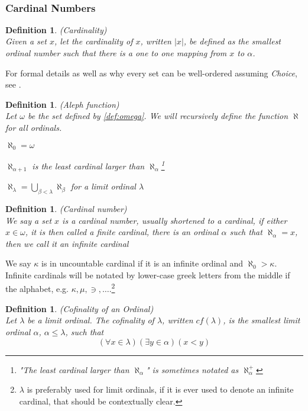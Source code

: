 \documentclass[12pt,a4paper]{article}
\newtheorem{definition}[theorem]{Definition}
\newcommand{\bce}{\begin{compactenum}}
\newcommand{\ece}{\end{compactenum}}
\begin{document}
\

\subsubsection{Cardinal Numbers}

\begin{definition}{(Cardinality)}\\
Given a set $x$, let the cardinality of $x$, written $|x|$, be defined as the smallest ordinal number such that there is a one to one mapping from $x$ to $\alpha$.
\end{definition}
For formal details as well as why every set can be well-ordered assuming \emph{Choice}, see \cite{JechBook}.

\begin{definition}{(Aleph function)}\label{def:aleph}\\
Let $\omega$ be the set defined by \ref{def:omega}.
We will recursively define the function $\aleph$ for all ordinals.
\bce[(i)]
\item $\aleph_0 = \omega$
\item $\aleph_{\alpha+1}$ is the least cardinal larger than $\aleph_\alpha$\footnote{"The least cardinal larger than $\aleph_\alpha$" is sometimes notated as $\aleph_\alpha^{+}$}
\item $\aleph_\lambda = \bigcup_{\beta < \lambda}\aleph_\beta$ for a limit ordinal $\lambda$
\ece
\end{definition}

\begin{definition}{(Cardinal number)}\label{def:cardinal}\\
We say a set $x$ is a \emph{cardinal number}, usually shortened to \emph{a cardinal}, if either $x \in \omega$, it is then called a \emph{finite cardinal}, 
there is an ordinal $\alpha$ such that $\aleph_\alpha = x$, then we call it \emph{an infinite cardinal}
\end{definition}
We say $\kappa$ is in uncountable cardinal if it is an infinite ordinal and $\aleph_0 > \kappa$.
Infinite cardinals will be notated by lower-case greek letters from the middle if the alphabet, e.g. $\kappa, \mu, \ni, \ldots$.\footnote{$\lambda$ is preferably used for limit ordinals, if it is ever used to denote an infinite cardinal, that should be contextually clear.}

\begin{definition}{(Cofinality of an Ordinal)}\label{def:cofinality}\\ %
Let $\lambda$ be a limit ordinal. The \emph{cofinality} of $\lambda$, written $cf(\lambda)$, is the smallest limit ordinal $\alpha$, $\alpha \leq \lambda$, such that 
\begin{equation}
(\forall x \in \lambda)(\exists y \in \alpha)(x < y)
\end{equation}
\end{definition}
\end{document}
